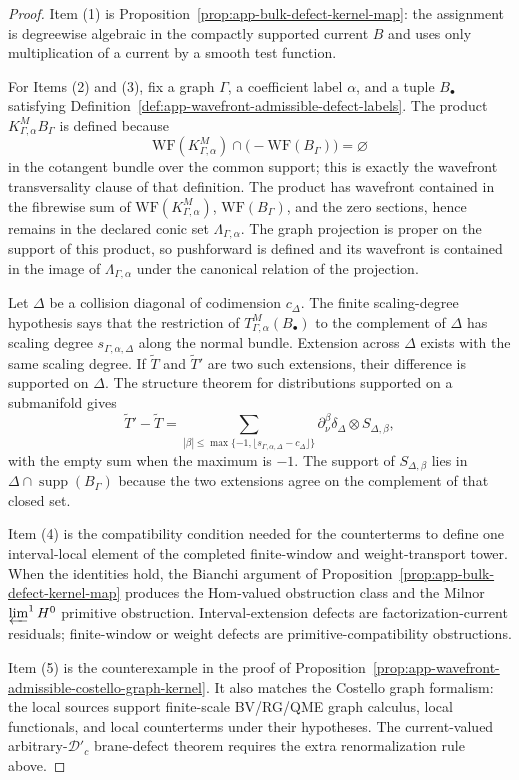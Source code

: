 \begin{proof}
  Item (1) is
  Proposition~\ref{prop:app-bulk-defect-kernel-map}: the assignment is
  degreewise algebraic in the compactly supported current \(B\) and uses
  only multiplication of a current by a smooth test function.

  For Items (2) and (3), fix a graph \(\Gamma\), a coefficient label
  \(\alpha\), and a tuple \(B_\bullet\) satisfying
  Definition~\ref{def:app-wavefront-admissible-defect-labels}.  The
  product \(K^M_{\Gamma,\alpha}B_\Gamma\) is defined because
  \[
    \mathrm{WF}(K^M_{\Gamma,\alpha})
    \cap
    \bigl(-\mathrm{WF}(B_\Gamma)\bigr)
    =\varnothing
  \]
  in the cotangent bundle over the common support; this is exactly the
  wavefront transversality clause of that definition.  The product has
  wavefront contained in the fibrewise sum of
  \(\mathrm{WF}(K^M_{\Gamma,\alpha})\), \(\mathrm{WF}(B_\Gamma)\), and
  the zero sections, hence remains in the declared conic set
  \(\Lambda_{\Gamma,\alpha}\).  The graph projection is proper on the
  support of this product, so pushforward is defined and its wavefront is
  contained in the image of \(\Lambda_{\Gamma,\alpha}\) under the
  canonical relation of the projection.

  Let \(\Delta\) be a collision diagonal of codimension \(c_\Delta\).
  The finite scaling-degree hypothesis says that the restriction of
  \(T^M_{\Gamma,\alpha}(B_\bullet)\) to the complement of \(\Delta\) has
  scaling degree \(s_{\Gamma,\alpha,\Delta}\) along the normal bundle.
  Extension across \(\Delta\) exists with the same scaling degree.  If
  \(\widetilde T\) and \(\widetilde T'\) are two such extensions, their
  difference is supported on \(\Delta\).  The structure theorem for
  distributions supported on a submanifold gives
  \[
    \widetilde T'-\widetilde T
    =
    \sum_{|\beta|\le
      \max\{-1,\lfloor s_{\Gamma,\alpha,\Delta}-c_\Delta\rfloor\}}
    \partial_\nu^\beta\delta_\Delta\otimes S_{\Delta,\beta},
  \]
  with the empty sum when the maximum is \(-1\).  The support of
  \(S_{\Delta,\beta}\) lies in
  \(\Delta\cap\operatorname{supp}(B_\Gamma)\) because the two extensions
  agree on the complement of that closed set.

  Item (4) is the compatibility condition needed for the counterterms to
  define one interval-local element of the completed finite-window and
  weight-transport tower.  When
  the identities hold, the Bianchi argument of
  Proposition~\ref{prop:app-bulk-defect-kernel-map} produces the
  Hom-valued obstruction class and the Milnor
  \(\varprojlim^1H^0\) primitive obstruction.  Interval-extension defects
  are factorization-current residuals; finite-window or weight defects are
  primitive-compatibility obstructions.

  Item (5) is the counterexample in the proof of
  Proposition~\ref{prop:app-wavefront-admissible-costello-graph-kernel}.
  It also matches the Costello graph formalism: the local sources support
  finite-scale BV/RG/QME graph calculus, local functionals, and local
  counterterms under their hypotheses.  The current-valued
  arbitrary-\(\mathcal D'_c\) brane-defect theorem requires the extra
  renormalization rule above.
\end{proof}

